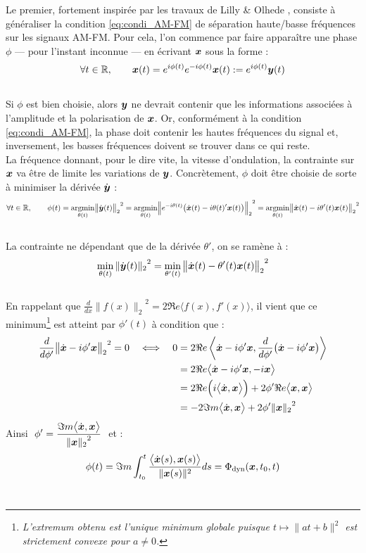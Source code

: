Le premier, fortement inspirée par les travaux de Lilly \& Olhede  \cite{lilly_analysis_2012}, consiste à généraliser la condition \eqref{eq:condi_AM-FM} de séparation haute/basse fréquences sur les signaux AM-FM.
Pour cela, l'on commence par faire apparaître une phase $\phi$ --- pour l'instant inconnue --- en écrivant $\x$ sous la forme :
\[\forall t\in\R,\qquad \x(t) = e^{i\phi(t)} e^{-i\phi(t)} \x(t) \defeq e^{i\phi(t)} \bf{y}(t)\]
\\
Si $\phi$ est bien choisie, alors $\bf{y}$ ne devrait contenir que les informations associées à l'amplitude et la polarisation de $\x$. Or, conformément à la condition \eqref{eq:condi_AM-FM}, la phase doit contenir les hautes fréquences du signal et, inversement, les basses fréquences doivent se trouver dans ce qui reste. 
\\
La fréquence donnant, pour le dire vite, la vitesse d'ondulation, la contrainte sur $\x$ va être de limite les variations de  $\bf{y}$. Concrètement, $\phi$ doit être choisie de sorte à minimiser la dérivée $\dot{\bf{y}}$ :
\[\forall t\in\R,\qquad \phi(t) = \argmin{\theta(t)}{\big\|\dot{\bf{y}}(t)\big\|_2}^2 = \argmin{\theta(t)}{\Big\|e^{-i\theta(t)}\big(\dot{\x}(t) - i\theta(t)'\x(t)\big)\Big\|_2}^2 = \argmin{\theta(t)}{\big\|\dot{\x}(t) - i\theta'(t)\x(t)\big\|_2}^2\]
\\
La contrainte ne dépendant que de la dérivée $\theta'$, on se ramène à :
\[\min_{\theta(t)}{\|\dot{\bf{y}}(t)\|_2}^2 = \min_{\theta'(t)}{\big\|\dot{\x}(t) - \theta'(t) \x(t)\big\|_2}^2\]
\\
En rappelant que $\frac{d}{dx}{\big\|f(x)\big\|_2}^2 = 2\Re e\big\langle f(x), f'(x)\big\rangle$, il vient que ce minimum\footnote{\itshape
	L'extremum obtenu est l'unique minimum globale puisque $t\longmapsto \|at + b\|^2$ est strictement convexe pour $a\neq0$.}
est atteint par $\phi'(t)$ à condition que :
\begin{align*}
	\frac{d}{d\phi'}{\big\| \dot{\x} - i\phi' \x\big\|_2}^2 = 0 \quad \Llr\quad
	0 &= 2\Re e\left\langle  \dot{\x} - i\phi' \x ,  \frac{d}{d\phi'}\big(\dot{\x} - i\phi' \x\big)\right\rangle \\
	&= 2\Re e\big\langle  \dot{\x} - i\phi' \x ,  - i \x\big\rangle \\
	&= 2\Re e\Big(i\big\langle  \dot{\x} ,  \x\big\rangle\Big) + 2\phi'\Re e\big\langle   \x ,  \x\big\rangle\\
	&= -2\Im m\big\langle  \dot{\x} ,  \x\big\rangle + 2\phi'{\| \x\|_2}^2
\end{align*}
Ainsi $\displaystyle \ \phi' = \frac{\Im m\big\langle  \dot{\x} ,  \x\big\rangle}{{\| \x\|_2}^2}\ $ et :
\begin{equation}\label{eq:phas_inst_v1}
  \phi(t) = \Im m\int_{t_0}^t \frac{\big\langle \dot{\x}(s) , \x(s) \big\rangle}{\|\x(s)\|^2} ds = \phased(\x,t_0,t)
\end{equation}
\\

